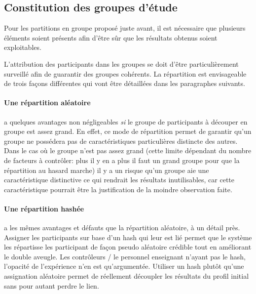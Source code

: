 \documentclass[a4paper]{report}
\begin{document}
\subsection{Constitution des groupes d'étude}
Pour les partitions en groupe proposé juste avant, il est nécessaire que plusieurs éléments soient présents afin d'être sûr que les résultats obtenus soient exploitables.

L'attribution des participants dans les groupes se doit d'être particulièrement surveillé afin de guarantir des groupes cohérents.
La répartition est envisageable de trois façons différentes qui vont être détaillées dans les paragraphes suivants.

\paragraph{Une répartition aléatoire} a quelques avantages non négligeables \textit{si} le groupe de participants à découper en groupe est assez grand.
En effet, ce mode de répartition permet de garantir qu'un groupe ne possédera pas de caractéristiques particulières distincte des autres.
Dans le cas où le groupe n'est pas assez grand (cette limite dépendant du nombre de facteurs à contrôler: plus il y en a plus il faut un grand groupe pour que la répartition au hasard marche) il y a un risque qu'un groupe aie une caractéristique distinctive ce qui rendrait les résultats inutilisables, car cette caractéristique pourrait être la justification de la moindre observation faite.

\paragraph{Une répartition hashée} a les mêmes avantages et défauts que la répartition aléatoire, à un détail près.
Assigner les participants sur base d'un hash qui leur est lié permet que le système les répartisse les participant de façon pseudo aléatoire crédible tout en améliorant le double aveugle.
Les contrôleurs / le personnel enseignant n'ayant pas le hash, l'opacité de l'expérience n'en est qu'argumentée.
Utiliser un hash plutôt qu'une assignation aléatoire permet de réellement découpler les résultats du profil initial sans pour autant perdre le lien.
\end{document}
